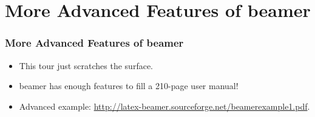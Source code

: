 \documentclass{beamer}
\begin{document}
\section{More Advanced Features of {\sc beamer}}

\begin{frame}
\frametitle{More Advanced Features of {\sc beamer}} 

\begin{itemize}

\item This tour just scratches the surface.  
\pause

\item {\sc beamer} has enough features to fill a 210-page user manual!  
\pause

\item Advanced example:
\url{http://latex-beamer.sourceforge.net/beamerexample1.pdf}.

\end{itemize}

\end{frame}
\end{document}
